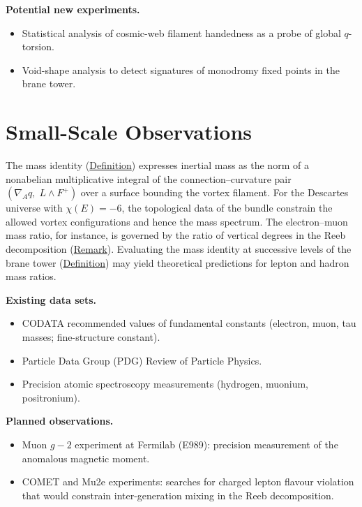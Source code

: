 \textbf{Potential new experiments.}

\begin{itemize}
  \item Statistical analysis of cosmic-web filament handedness as a probe of global $q$-torsion.
  \item Void-shape analysis to detect signatures of monodromy fixed points in the brane tower.
\end{itemize}

\section{Small-Scale Observations}
\label{sec:small-scale}

\begin{remark}
  \label{rem:mass-ratio-predictions}
The mass identity (\hyperref[def:mass-identity]{Definition}) expresses inertial mass
as the norm of a nonabelian multiplicative integral of the connection--curvature
pair $(\nabla_A q,\; L \wedge F^+)$ over a surface bounding the vortex
filament. For the Descartes universe with $\chi(E) = -6$, the
topological data of the bundle constrain the allowed vortex configurations and
hence the mass spectrum. The electron--muon mass ratio, for instance, is
governed by the ratio of vertical degrees in the Reeb decomposition
(\hyperref[rem:descartes-leptons]{Remark}). Evaluating the mass identity at
successive levels of the brane tower
(\hyperref[def:recursive-brane-tower]{Definition}) may yield theoretical predictions
for lepton and hadron mass ratios.
\end{remark}

\textbf{Existing data sets.}

\begin{itemize}
  \item CODATA recommended values of fundamental constants (electron, muon, tau masses; fine-structure constant).
  \item Particle Data Group (PDG) Review of Particle Physics.
  \item Precision atomic spectroscopy measurements (hydrogen, muonium, positronium).
\end{itemize}

\textbf{Planned observations.}

\begin{itemize}
  \item Muon $g-2$ experiment at Fermilab (E989): precision measurement of the anomalous magnetic moment.
  \item COMET and Mu2e experiments: searches for charged lepton flavour violation that would constrain inter-generation mixing in the Reeb decomposition.
\end{itemize}

